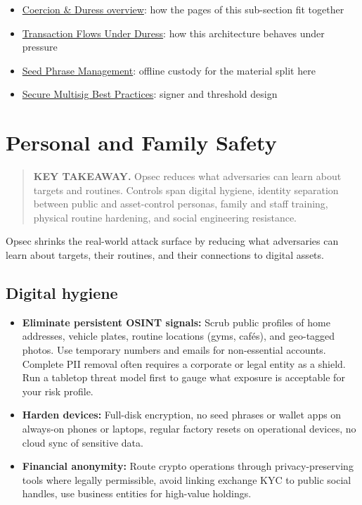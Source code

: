 \begin{itemize}
\tightlist
\item
  \href{https://frameworks.securityalliance.dev/physical-security/coercion-and-duress/overview}{Coercion \& Duress overview}: how the pages of this sub-section fit together
\item
  \href{https://frameworks.securityalliance.dev/physical-security/coercion-and-duress/transaction-flows-under-duress}{Transaction Flows Under Duress}: how this architecture behaves under pressure
\item
  \href{https://frameworks.securityalliance.dev/wallet-security/seed-phrase-management}{Seed Phrase Management}: offline custody for the material split here
\item
  \href{https://frameworks.securityalliance.dev/wallet-security/secure-multisig-best-practices}{Secure Multisig Best Practices}: signer and threshold design
\end{itemize}

\chapter{Personal and Family Safety}\label{personal-and-family-safety}

\begin{quote}
\textbf{KEY TAKEAWAY.} Opsec reduces what adversaries can learn about targets and routines. Controls span digital hygiene, identity separation between public and asset-control personas, family and staff training, physical routine hardening, and social engineering resistance.
\end{quote}

Opsec shrinks the real-world attack surface by reducing what adversaries can learn about targets, their routines, and their connections to digital assets.

\section{Digital hygiene}\label{digital-hygiene}

\begin{itemize}
\tightlist
\item
  \textbf{Eliminate persistent OSINT signals:} Scrub public profiles of home addresses, vehicle plates, routine locations (gyms, cafés), and geo-tagged photos. Use temporary numbers and emails for non-essential accounts. Complete PII removal often requires a corporate or legal entity as a shield. Run a tabletop threat model first to gauge what exposure is acceptable for your risk profile.
\item
  \textbf{Harden devices:} Full-disk encryption, no seed phrases or wallet apps on always-on phones or laptops, regular factory resets on operational devices, no cloud sync of sensitive data.
\item
  \textbf{Financial anonymity:} Route crypto operations through privacy-preserving tools where legally permissible, avoid linking exchange KYC to public social handles, use business entities for high-value holdings.
\end{itemize}

